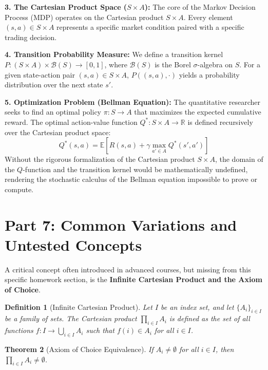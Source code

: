 \documentclass[11pt]{article}
\newtheorem{theorem}{Theorem}[section]
\newtheorem{definition}[theorem]{Definition}
\newcommand{\R}{\mathbb{R}}
\begin{document}
\textbf{3. The Cartesian Product Space ($S \times A$):}
The core of the Markov Decision Process (MDP) operates on the Cartesian product $S \times A$. Every element $(s, a) \in S \times A$ represents a specific market condition paired with a specific trading decision.

\textbf{4. Transition Probability Measure:}
We define a transition kernel $P: (S \times A) \times \mathscr{B}(S) \to [0, 1]$, where $\mathscr{B}(S)$ is the Borel $\sigma$-algebra on $S$. For a given state-action pair $(s, a) \in S \times A$, $P((s, a), \cdot)$ yields a probability distribution over the next state $s'$.

\textbf{5. Optimization Problem (Bellman Equation):}
The quantitative researcher seeks to find an optimal policy $\pi: S \to A$ that maximizes the expected cumulative reward. The optimal action-value function $Q^*: S \times A \to \R$ is defined recursively over the Cartesian product space:
\[ Q^*(s, a) = \mathbb{E} \left[ R(s, a) + \gamma \max_{a' \in A} Q^*(s', a') \right] \]
Without the rigorous formalization of the Cartesian product $S \times A$, the domain of the $Q$-function and the transition kernel would be mathematically undefined, rendering the stochastic calculus of the Bellman equation impossible to prove or compute.

\section{Part 7: Common Variations and Untested Concepts}

A critical concept often introduced in advanced courses, but missing from this specific homework section, is the \textbf{Infinite Cartesian Product and the Axiom of Choice}.

\begin{definition}[Infinite Cartesian Product]
Let $I$ be an index set, and let $\{A_i\}_{i \in I}$ be a family of sets. The Cartesian product $\prod_{i \in I} A_i$ is defined as the set of all functions $f: I \to \bigcup_{i \in I} A_i$ such that $f(i) \in A_i$ for all $i \in I$.
\end{definition}

\begin{theorem}[Axiom of Choice Equivalence]
If $A_i \neq \emptyset$ for all $i \in I$, then $\prod_{i \in I} A_i \neq \emptyset$.
\end{theorem}
\end{document}
